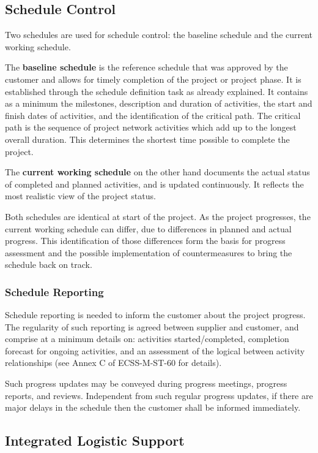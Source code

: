 \subsection{Schedule Control}

Two schedules are used for schedule control: the baseline schedule and the current working schedule. 

The \textbf{baseline schedule} is the reference schedule that was approved by the customer and allows for timely completion of the project or project phase. It is established through the schedule definition task as already explained. It contains as a minimum the milestones, description and duration of activities, the start and finish dates of activities, and the identification of the critical path. The critical path is the sequence of project network activities which add up to the longest overall duration. This determines the shortest time possible to complete the project.

The \textbf{current working schedule} on the other hand documents the actual status of completed and planned activities, and is updated continuously. It reflects the most realistic view of the project status.

Both schedules are identical at start of the project. As the project progresses, the current working schedule can differ, due to differences in planned and actual progress. This identification of those differences form the basis for progress assessment and the possible implementation of countermeasures to bring the schedule back on track.

\subsubsection{Schedule Reporting}

Schedule reporting is needed to inform the customer about the project progress. The regularity of such reporting is agreed between supplier and customer, and comprise at a minimum details on: activities started/completed, completion forecast for ongoing activities, and an assessment of the logical between activity relationships (see Annex C of ECSS-M-ST-60 for details).

Such progress updates may be conveyed during progress meetings, progress reports, and reviews. Independent from such regular progress updates, if there are major delays in the schedule then the customer shall be informed immediately.

\subsection{Integrated Logistic Support}

